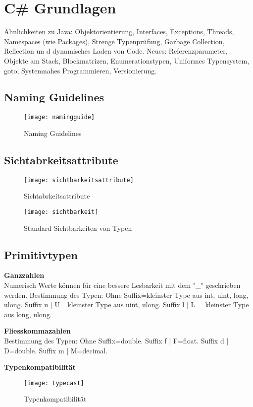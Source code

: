 
\section{C\# Grundlagen}
Ähnlichkeiten zu Java: Objektorientierung, Interfaces, Exceptions, Threads, Namespaces (wie Packages), Strenge Typenprüfung, Garbage Collection, Reflection un d dynamisches Laden von Code.
Neues: Referenzparameter, Objekte am Stack, Blockmatrizen, Enumerationstypen, Uniformes Typensystem, goto, Systemnahes Programmieren, Versionierung.

\subsection{Naming Guidelines}
\begin{figure}[h!]
	\centering
  	\texttt{[image: namingguide]}
    \caption{Naming Guidelines}
\end{figure}

\subsection{Sichtabrkeitsattribute}
\begin{figure}[h!]
	\centering
  	\texttt{[image: sichtbarkeitsattribute]}
    \caption{Sichtabrkeitsattribute}
\end{figure}

\begin{figure}[h!]
	\centering
  	\texttt{[image: sichtbarkeit]}
    \caption{Standard Sichtbarkeiten von Typen}
\end{figure}

\subsection{Primitivtypen}
\textbf{Ganzzahlen}\\
Numerisch Werte können für eine bessere Lesbarkeit mit dem "\_" geschrieben werden.
Bestimmung des Typen: Ohne Suffix=kleinster Type aus int, uint, long, ulong. Suffix u | U =kleinster Type aus uint, ulong. Suffix l | L = kleinster Type aus long, ulong.

\textbf{Fliesskommazahlen}\\
Bestimmung des Typen: Ohne Suffix=double. Suffix f | F=float. Suffix d | D=double. Suffix m | M=decimal.

\textbf{Typenkompatibilität}
\begin{figure}[h!]
	\centering
  	\texttt{[image: typecast]}
    \caption{Typenkompatibilität}
\end{figure}

